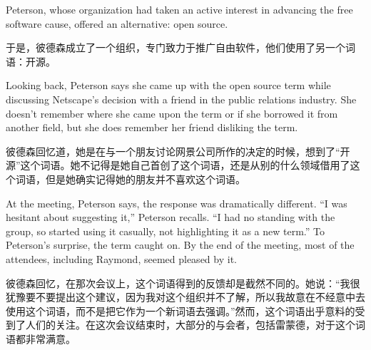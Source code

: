 
\ifdefined\eng
Peterson, whose organization had taken an active interest in advancing the free software cause, offered an alternative: open source.
\fi

\ifdefined\chs
于是，彼德森成立了一个组织，专门致力于推广自由软件，他们使用了另一个词语：开源。
\fi

\ifdefined\eng
Looking back, Peterson says she came up with the open source term while discussing Netscape's decision with a friend in the public relations industry. She doesn't remember where she came upon the term or if she borrowed it from another field, but she does remember her friend disliking the term.
\fi

\ifdefined\chs
彼德森回忆道，她是在与一个朋友讨论网景公司所作的决定的时候，想到了``开源''这个词语。她不记得是她自己首创了这个词语，还是从别的什么领域借用了这个词语，但是她确实记得她的朋友并不喜欢这个词语。
\fi

\ifdefined\eng
At the meeting, Peterson says, the response was dramatically different. ``I was hesitant about suggesting it,'' Peterson recalls. ``I had no standing with the group, so started using it casually, not highlighting it as a new term.'' To Peterson's surprise, the term caught on. By the end of the meeting, most of the attendees, including Raymond, seemed pleased by it.
\fi

\ifdefined\chs
彼德森回忆，在那次会议上，这个词语得到的反馈却是截然不同的。她说：``我很犹豫要不要提出这个建议，因为我对这个组织并不了解，所以我故意在不经意中去使用这个词语，而不是把它作为一个新词语去强调。''然而，这个词语出乎意料的受到了人们的关注。在这次会议结束时，大部分的与会者，包括雷蒙德，对于这个词语都非常满意。
\fi

